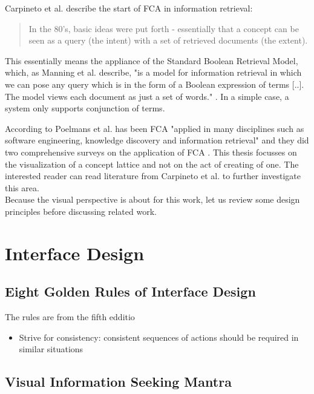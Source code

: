 \documentclass[11pt]{report}
\begin{document}
Carpineto et al.\cite{Carpineto2005} describe the start of FCA in information retrieval:

\begin{quote}
In the 80's, basic ideas were put forth - essentially that a concept can be seen as a query (the intent) with a set of retrieved documents (the extent).
\end{quote}

This essentially means the appliance of the Standard Boolean Retrieval Model, which, as Manning et al. \cite{Manning2009} describe, "is a model for information retrieval in which we can pose any query which is in the form of a Boolean expression of terms [..]. The model views each document as just a set of words." . In a simple case, a system only supports conjunction of terms.

According to Poelmans et al. has been FCA "applied in many disciplines such as software engineering, knowledge discovery and information retrieval" \cite{Poelmans2013} and they did two comprehensive surveys on the application of FCA \cite{Poelmans2013, Poelmans2013b}. This thesis focusses on the visualization of a concept lattice and not on the act of creating of one. The interested reader can read literature from Carpineto et al. \cite{carpineto2004concept,Carpineto2005} to further investigate this area. \\

Because the visual perspective is about for this work, let us review some design principles before discussing related work.

\section{Interface Design}

\subsection{Eight Golden Rules of Interface Design}

The rules are from the fifth edditio

\begin{itemize}
	\item Strive for consistency: consistent sequences of actions should be required in similar situations
\end{itemize}

\subsection{Visual Information Seeking Mantra}
\end{document}
